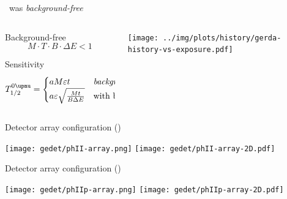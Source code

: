 \documentclass[10pt,aspectratio=169]{beamer}
\renewcommand{\epsilon}{\varepsilon}
\begin{document}
\begin{frame}{\gerdatwo\ was \emph{background-free}}
  \begin{columns}
    \begin{column}{0.4\textwidth}
      \begin{exampleblock}{Background-free}
        \[ M \cdot T \cdot B \cdot \Delta{E} < 1 \]
      \end{exampleblock}

      \begin{exampleblock}{Sensitivity}
        \[ T^{0\upnu}_{1/2} =
          \begin{cases}
            a M \epsilon t & \text{\emph{background-free}} \\
            a \epsilon \sqrt{\frac{M t}{B \Delta{E}}} & \text{with background} \\
          \end{cases} \]
      \end{exampleblock}
    \end{column}
    \begin{column}{0.6\textwidth}
      \begin{center}
        \texttt{[image: ../img/plots/history/gerda-history-vs-exposure.pdf]}
      \end{center}
    \end{column}
  \end{columns}
\end{frame}
\begin{frame}{Detector array configuration (\phasetwo)}
  \begin{center}
    \texttt{[image: gedet/phII-array.png]}%
    \hspace{0.5cm}%
    \texttt{[image: gedet/phII-array-2D.pdf]}
  \end{center}
\end{frame}
\begin{frame}{Detector array configuration (\phasetwop)}
  \begin{center}
    \texttt{[image: gedet/phIIp-array.png]}%
    \hspace{0.5cm}%
    \texttt{[image: gedet/phIIp-array-2D.pdf]}
  \end{center}
\end{frame}
\end{document}
